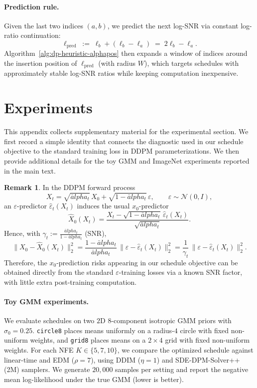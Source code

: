 \documentclass[11pt]{article}
\def\alpha{alpha}%
\def\times{×}%
\theoremstyle{definition}
\newtheorem{remark}{Remark}
\numberwithin{equation}{section}
\begin{document}
\paragraph{Prediction rule.}
Given the last two indices $(a,b)$, we predict the next log-SNR via constant log-ratio continuation:
\begin{equation}
\ell_{\mathrm{pred}} \;:=\; \ell_b + (\ell_b-\ell_a) \;=\; 2\ell_b-\ell_a .
\end{equation}
Algorithm~\ref{alg:dp-heuristic-alphapos} then expands a window of indices around the insertion position of
$\ell_{\mathrm{pred}}$ (with radius $W$), which targets schedules with approximately stable log-SNR ratios while
keeping computation inexpensive.


\section{Experiments }\label{app:toy}


This appendix collects supplementary material for the experimental section.
We first record a simple identity that connects the diagnostic used in our schedule objective to the standard
training loss in DDPM parameterizations. We then provide additional details for the toy GMM and ImageNet
experiments reported in the main text.

\begin{remark}
In the DDPM forward process
\begin{equation*}
X_t=\sqrt{\bar\alpha_t}\,X_0+\sqrt{1-\bar\alpha_t}\,\varepsilon,\qquad \varepsilon\sim\mathcal N(0,I),
\end{equation*}
an $\varepsilon$-predictor $\hat\varepsilon_t(X_t)$ induces the usual $x_0$-predictor
\[
\hat X_0(X_t)=\frac{X_t-\sqrt{1-\bar\alpha_t}\,\hat\varepsilon_t(X_t)}{\sqrt{\bar\alpha_t}}.
\]
Hence, with $\gamma_t:=\frac{\bar\alpha_t}{1-\bar\alpha_t}$ (SNR),
\begingroup
\small
\begin{equation*}
\label{eq:eps_x0_identity}
\|X_0-\hat X_0(X_t)\|_2^2
=\frac{1-\bar\alpha_t}{\bar\alpha_t}\,\|\varepsilon-\hat\varepsilon_t(X_t)\|_2^2
=\frac{1}{\gamma_t}\,\|\varepsilon-\hat\varepsilon_t(X_t)\|_2^2.
\end{equation*}
\endgroup
Therefore, the $x_0$-prediction risks appearing in our schedule objective can be obtained directly from the
standard $\varepsilon$-training losses via a known SNR factor, with little extra post-training computation.
\end{remark}

\paragraph{Toy GMM experiments.}
We evaluate schedules on two $2$D $8$-component isotropic GMM priors with $\sigma_0=0.25$.
\texttt{circle8} places means uniformly on a radius-$4$ circle with fixed non-uniform weights, and
\texttt{grid8} places means on a $2\times4$ grid with fixed non-uniform weights.
For each NFE $K\in\{5,7,10\}$, we compare the optimized schedule against linear-time and EDM ($\rho=7$),
using DDIM ($\eta=1$) and SDE-DPM-Solver++(2M) samplers. We generate $20{,}000$ samples per setting and report the
negative mean log-likelihood under the true GMM (lower is better).
\end{document}

